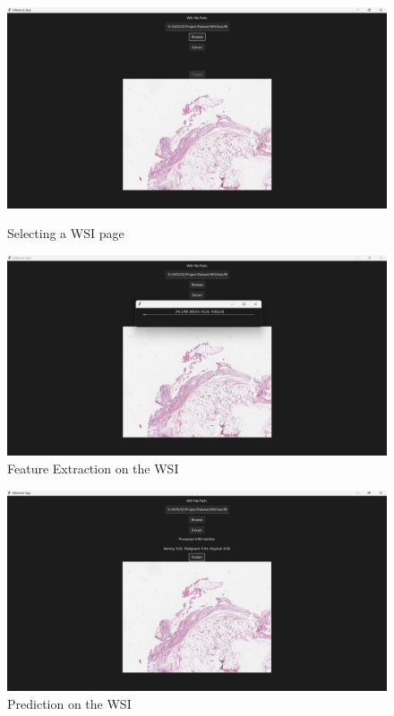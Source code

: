 \documentclass[
11pt, %
english, %
singlespacing, %
headsepline, %
]{project_structure}
\begin{document}
\begin{figure}[H]
    \centering
    \begin{minipage}{0.49\textwidth}
        \centering
        \includegraphics[width=1\linewidth]{figures/SI/desktop/select_wsi.png}
        \caption{Selecting a WSI page}
        \label{fig:app_select_wsi}
    \end{minipage}
    \hfill
    \begin{minipage}{0.49\textwidth}
        \centering
        \includegraphics[width=1\linewidth]{figures/SI/desktop/feature_extraction.png}
        \caption{Feature Extraction on the WSI}
        \label{fig:app_feature_extraction}
    \end{minipage}
\end{figure}

\begin{figure}[H]
    \centering
    \includegraphics[width=1\linewidth]{figures/SI/desktop/prediction.png}
    \caption{Prediction on the WSI}
    \label{fig:app_pred}
\end{figure}
\end{document}
